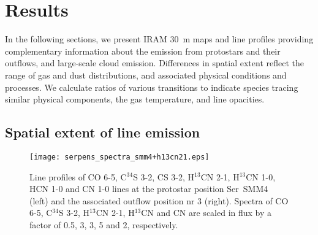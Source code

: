 \documentclass{aa}
\begin{document}
\section{Results} 
\label{section:results}

In the following sections, we present IRAM 30~m maps and line profiles 
providing complementary information about the emission from 
protostars and their outflows, and large-scale cloud emission.
Differences in spatial extent reflect the range of gas and dust 
distributions, and associated physical conditions and processes. 
We calculate ratios of various transitions to indicate species tracing similar physical components, the gas temperature,
and line opacities. 

\subsection{Spatial extent of line emission}
\label{subsection:emission}

\begin{figure*} 
\texttt{[image: serpens\_spectra\_smm4+h13cn21.eps]} 
\caption{ \label{SMM4spectra} Line profiles of CO 6-5, C$^{34}$S 3-2, CS 3-2, H$^{13}$CN 2-1, H$^{13}$CN 1-0, HCN 1-0 and CN 1-0 lines at the protostar position Ser~SMM4 (left) and the associated outflow position nr 3 (right). Spectra of CO 6-5, C$^{34}$S 3-2, H$^{13}$CN 2-1, H$^{13}$CN and CN are scaled in flux by a factor of 0.5, 3, 3, 5 and 2, respectively.} 
\end{figure*}
\end{document}
